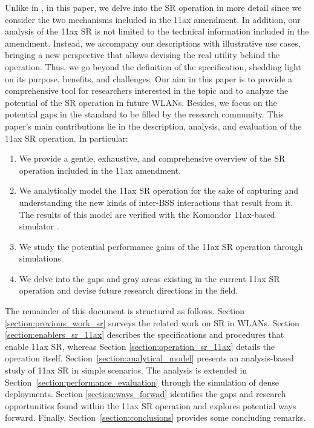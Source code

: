 \documentclass[preprint,12pt]{elsarticle}
\theoremstyle{plain}
\begin{document}
Unlike in \cite{mori2014performance, qu2018survey, shen2018research}, in this paper, we delve into the SR operation in more detail since we consider the two mechanisms included in the 11ax amendment. In addition, our analysis of the 11ax SR is not limited to the technical information included in the amendment. Instead, we accompany our descriptions with illustrative use cases, bringing a new perspective that allows devising the real utility behind the operation. Thus, we go beyond the definition of the specification, shedding light on its purpose, benefits, and challenges. Our aim in this paper is to provide a comprehensive tool for researchers interested in the topic and to analyze the potential of the SR operation in future WLANs. Besides, we focus on the potential gaps in the standard to be filled by the research community. This paper's main contributions lie in the description, analysis, and evaluation of the 11ax SR operation. In particular:
\begin{enumerate}
	\item We provide a gentle, exhaustive, and comprehensive overview of the SR operation included in the 11ax amendment.
	\item We analytically model the 11ax SR operation for the sake of capturing and understanding the new kinds of inter-BSS interactions that result from it. The results of this model are verified with the Komondor 11ax-based simulator \cite{barrachina2019komondor}.
	\item We study the potential performance gains of the 11ax SR operation through simulations. 
	\item We delve into the gaps and gray areas existing in the current 11ax SR operation and devise future research directions in the field.
\end{enumerate}

The remainder of this document is structured as follows. Section \ref{section:previous_work_sr} surveys the related work on SR in WLANs. Section \ref{section:enablers_sr_11ax} describes the specifications and procedures that enable 11ax SR, whereas Section \ref{section:operation_sr_11ax} details the operation itself. Section~\ref{section:analytical_model} presents an analysis-based study of 11ax SR in simple scenarios. The analysis is extended in Section~\ref{section:performance_evaluation} through the simulation of dense deployments. Section \ref{section:ways_forwad} identifies the gaps and research opportunities found within the 11ax SR operation and explores potential ways forward. Finally, Section~\ref{section:conclusions} provides some concluding remarks.
\end{document}
